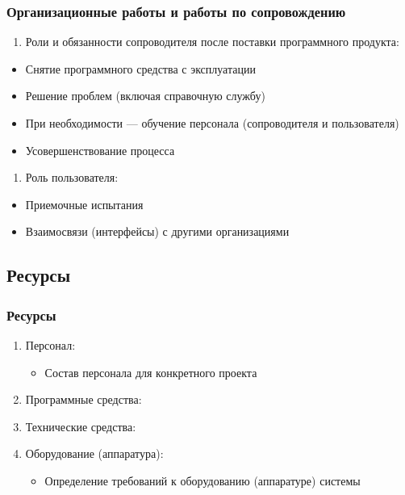 \documentclass{../industrial-development}
\begin{document}
\lecturenotes

\begin{frame} \frametitle{Организационные работы и работы по сопровождению}
	\begin{enumerate}[2] \item Роли и обязанности сопроводителя после поставки программного продукта:  \end{enumerate}
	\begin{itemize}
		\item Снятие программного средства с эксплуатации 
		\item Решение проблем (включая справочную службу) 
		\item При необходимости — обучение персонала (сопроводителя и пользователя) 
		\item Усовершенствование процесса
	\end{itemize}
		\begin{enumerate}[3]\item Роль пользователя: \end{enumerate}
	\begin{itemize}
		\item Приемочные испытания  
		\item Взаимосвязи (интерфейсы) с другими организациями
	\end{itemize}
\end{frame}

\lecturenotes


\subsection{Ресурсы}
\begin{frame} \frametitle{Ресурсы}
	\begin{enumerate} \item Персонал:  
	\begin{itemize}
		\item Состав персонала для конкретного проекта 
	\end{itemize}
		\item Программные средства: 
		\item Технические средства: 
		\item Оборудование (аппаратура): 
	\begin{itemize}
		\item Определение требований к оборудованию (аппаратуре) системы 
	\end{itemize}
	\end{enumerate}
\end{frame}
\end{document}
